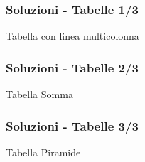 \begin{frame}[fragile]

  \frametitle{Soluzioni - Tabelle 1/3}

  \begin{soluzione}{Tabella con linea multicolonna}
  \end{soluzione}

\end{frame}

\begin{frame}[fragile]

  \frametitle{Soluzioni - Tabelle 2/3}

  \begin{soluzione}{Tabella Somma}
  \end{soluzione}

\end{frame}

\begin{frame}[fragile]

  \frametitle{Soluzioni - Tabelle 3/3}
  
  \begin{soluzione}{Tabella Piramide}
  \end{soluzione}

\end{frame}
